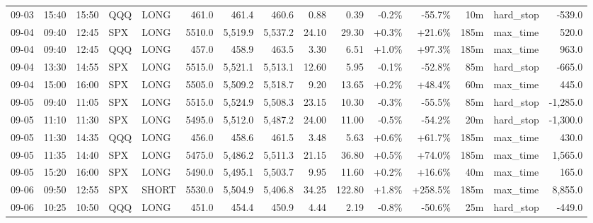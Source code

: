 \documentclass[11pt,a4paper,twoside]{article}
\begin{document}
\begin{landscape}
\begin{center}
\begin{longtable}{>{\color{txtmain}}l l l l l r r r r r r r r >{\color{txtmain}}l r}
09-03 & 15:40 & 15:50 & QQQ & LONG & 461.0 & 461.4 & 460.6 & 0.88 & 0.39 & \textcolor{lossred}{-0.2\%} & \textcolor{lossred}{-55.7\%} & 10m & hard\_stop & \textcolor{lossred}{-539.0} \\
09-04 & 09:40 & 12:45 & SPX & LONG & 5510.0 & 5,519.9 & 5,537.2 & 24.10 & 29.30 & \textcolor{wingreen}{+0.3\%} & \textcolor{wingreen}{+21.6\%} & 185m & max\_time & \textcolor{wingreen}{520.0} \\
09-04 & 09:40 & 12:45 & QQQ & LONG & 457.0 & 458.9 & 463.5 & 3.30 & 6.51 & \textcolor{wingreen}{+1.0\%} & \textcolor{wingreen}{+97.3\%} & 185m & max\_time & \textcolor{wingreen}{963.0} \\
09-04 & 13:30 & 14:55 & SPX & LONG & 5515.0 & 5,521.1 & 5,513.1 & 12.60 & 5.95 & \textcolor{lossred}{-0.1\%} & \textcolor{lossred}{-52.8\%} & 85m & hard\_stop & \textcolor{lossred}{-665.0} \\
09-04 & 15:00 & 16:00 & SPX & LONG & 5505.0 & 5,509.2 & 5,518.7 & 9.20 & 13.65 & \textcolor{wingreen}{+0.2\%} & \textcolor{wingreen}{+48.4\%} & 60m & max\_time & \textcolor{wingreen}{445.0} \\
09-05 & 09:40 & 11:05 & SPX & LONG & 5515.0 & 5,524.9 & 5,508.3 & 23.15 & 10.30 & \textcolor{lossred}{-0.3\%} & \textcolor{lossred}{-55.5\%} & 85m & hard\_stop & \textcolor{lossred}{-1,285.0} \\
09-05 & 11:10 & 11:30 & SPX & LONG & 5495.0 & 5,512.0 & 5,487.2 & 24.00 & 11.00 & \textcolor{lossred}{-0.5\%} & \textcolor{lossred}{-54.2\%} & 20m & hard\_stop & \textcolor{lossred}{-1,300.0} \\
09-05 & 11:30 & 14:35 & QQQ & LONG & 456.0 & 458.6 & 461.5 & 3.48 & 5.63 & \textcolor{wingreen}{+0.6\%} & \textcolor{wingreen}{+61.7\%} & 185m & max\_time & \textcolor{wingreen}{430.0} \\
09-05 & 11:35 & 14:40 & SPX & LONG & 5475.0 & 5,486.2 & 5,511.3 & 21.15 & 36.80 & \textcolor{wingreen}{+0.5\%} & \textcolor{wingreen}{+74.0\%} & 185m & max\_time & \textcolor{wingreen}{1,565.0} \\
09-05 & 15:20 & 16:00 & SPX & LONG & 5490.0 & 5,495.1 & 5,503.7 & 9.95 & 11.60 & \textcolor{wingreen}{+0.2\%} & \textcolor{wingreen}{+16.6\%} & 40m & max\_time & \textcolor{wingreen}{165.0} \\
09-06 & 09:50 & 12:55 & SPX & SHORT & 5530.0 & 5,504.9 & 5,406.8 & 34.25 & 122.80 & \textcolor{wingreen}{+1.8\%} & \textcolor{wingreen}{+258.5\%} & 185m & max\_time & \textcolor{wingreen}{8,855.0} \\
09-06 & 10:25 & 10:50 & QQQ & LONG & 451.0 & 454.4 & 450.9 & 4.44 & 2.19 & \textcolor{lossred}{-0.8\%} & \textcolor{lossred}{-50.6\%} & 25m & hard\_stop & \textcolor{lossred}{-449.0} \\

\end{longtable}
\end{center}
\end{landscape}
\end{document}
